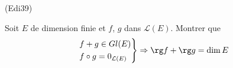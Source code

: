 \begin{tiny}(Edi39)\end{tiny} Soit $E$ de dimension finie et $f$, $g$ dans $\mathcal{L}(E)$. Montrer que
\begin{displaymath}
\left. 
\begin{aligned}
  &f+g \in Gl(E) \\ &f\circ g = 0_{\mathcal{L}(E)} 
\end{aligned}
\right\rbrace \Rightarrow
\rg f + \rg g = \dim E
\end{displaymath}
